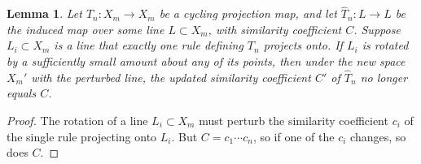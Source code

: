 \documentclass[12pt]{amsart}
\theoremstyle{theorem}
\newtheorem{lemma}{Lemma}
\theoremstyle{remark}
\numberwithin{equation}{section}
\begin{document}
\begin{lemma}\label{lem:lineRotation}
Let $T_n:X_m\rightarrow X_m$ be a cycling projection map, and let $\hat{T}_n:L\rightarrow L$ be the induced map over some line $L \subset X_m$, with similarity coefficient $C$.
Suppose $L_i \subset X_m$ is a line that exactly one rule defining $T_n$ projects onto.
If $L_i$ is rotated by a sufficiently small amount about any of its points, then under the new space $X_m'$ with the perturbed line, the updated similarity coefficient $C'$ of $\hat{T}_n$ no longer equals $C$.
\end{lemma}
\begin{proof}
The rotation of a line $L_i \subset X_m$ must perturb the similarity coefficient $c_i$ of the single rule projecting onto $L_i$. But $C=c_1\cdots c_n$, so if one of the $c_i$ changes, so does $C$.
\end{proof}
\end{document}
